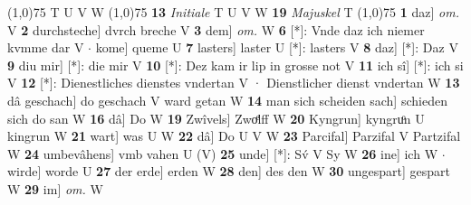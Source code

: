 \documentclass[8pt,a4paper,notitlepage]{article}
\begin{document}
\begin{table}[ht]
\begin{minipage}[t]{0.5\linewidth}
\line(1,0){75} \newline
T U V W \newline
\line(1,0){75} \newline
\textbf{13} \textit{Initiale} T U V W  \textbf{19} \textit{Majuskel} T  \newline
\line(1,0){75} \newline
\textbf{1} daz] \textit{om.} V \textbf{2} durchsteche] dvrch breche V \textbf{3} dem] \textit{om.} W \textbf{6} [*]: Vnde daz ich niemer kvmme dar V  $\cdot$ kome] queme U \textbf{7} lasters] laster U [*]: lasters V \textbf{8} daz] [*]: Daz V \textbf{9} diu mir] [*]: die mir V \textbf{10} [*]: Dez kam ir lip in grosse not V \textbf{11} ich sî] [*]: ich si V \textbf{12} [*]: Dienestliches dienstes vndertan V · Dienstlicher dienst vndertan W \textbf{13} dâ geschach] do geschach V ward getan W \textbf{14} man sich scheiden sach] schieden sich do san W \textbf{16} dâ] Do W \textbf{19} Zwîvels] Zwoͤlff W \textbf{20} Kyngrun] kyngruͦn U kingrun W \textbf{21} wart] was U W \textbf{22} dâ] Do U V W \textbf{23} Parcifal] Parzifal V Partzifal W \textbf{24} umbevâhens] vmb vahen U (V) \textbf{25} unde] [*]: Sv́ V Sy W \textbf{26} ine] ich W  $\cdot$ wirde] worde U \textbf{27} der erde] erden W \textbf{28} den] des den W \textbf{30} ungespart] gespart W \textbf{29} im] \textit{om.} W \newline
\end{minipage}
\end{table}
\end{document}
